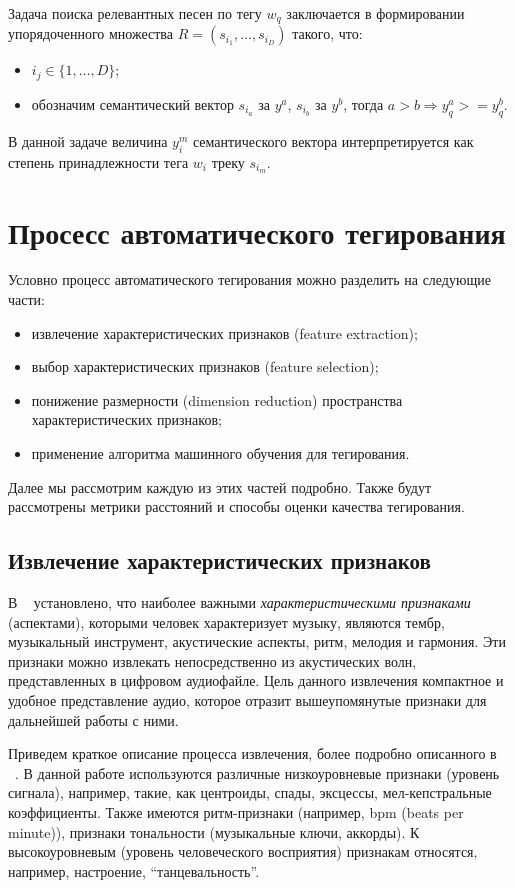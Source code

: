 Задача поиска релевантных песен по тегу $w_q$ заключается в формировании упорядоченного множества $R = (s_{i_1}, \ldots, s_{i_D})$ такого, что:
\begin{itemize}
 \item $i_j \in \{1, \ldots, D \}$;
 \item обозначим семантический вектор $s_{i_a}$ за $y^a$, $s_{i_b}$ \ld за $y^b$, тогда $a > b \Rightarrow y^a_q >= y^b_q $.
\end{itemize}
В данной задаче величина $y^m_i$ семантического вектора интерпретируется как степень принадлежности тега $w_i$ треку $s_{i_m}$. 
 
\section{Просесс автоматического тегирования}

Условно процесс автоматического тегирования можно разделить на следующие части:
\begin{itemize}
 \item извлечение характеристических признаков (feature extraction);
 \item выбор характеристических признаков (feature selection);
 \item понижение размерности (dimension reduction) пространства характеристических признаков;
 \item применение алгоритма машинного обучения для тегирования.
\end{itemize}

Далее мы рассмотрим каждую из этих частей подробно. Также будут рассмотрены метрики расстояний и способы оценки качества тегирования.

\subsection{Извлечение характеристических признаков}

В ~\cite{orio} установлено, что наиболее важными \emph{характеристическими признаками} (аспектами), 
которыми человек характеризует музыку, являются тембр, музыкальный инструмент, акустические аспекты, ритм, мелодия и гармония.
Эти признаки можно извлекать непосредственно из акустических волн, представленных в цифровом аудиофайле. Цель данного извлечения \ld компактное и удобное
представление аудио, которое отразит вышеупомянутые признаки для дальнейшей работы с ними.

Приведем краткое описание процесса извлечения, более подробно описанного в ~\cite{msordo_thesis}.
В данной работе используются различные низкоуровневые признаки (уровень сигнала), например, такие, как центроиды, спады, эксцессы, мел-кепстральные коэффициенты.
Также имеются ритм-признаки (например, bpm (beats per minute)), признаки тональности (музыкальные ключи, аккорды). К высокоуровневым (уровень человеческого восприятия) признакам 
относятся, например, настроение, ``танцевальность''.

